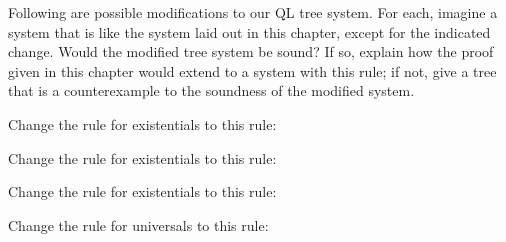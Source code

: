 \iffalse

\practiceproblems

\solutions
\problempart
\label{pr.QLalttrees-sound}
Following are possible modifications to our QL tree system. For each, imagine a system that is like the system laid out in this chapter, except for the indicated change. Would the modified tree system be sound? If so, explain how the proof given in this chapter would extend to a system with this rule; if not, give a tree that is a counterexample to the soundness of the modified system.
\begin{earg}
\item Change the rule for existentials to this rule:
	
\item Change the rule for existentials to this rule:

\item Change the rule for existentials to this rule:

\item Change the rule for universals to this rule:


\end{earg}
